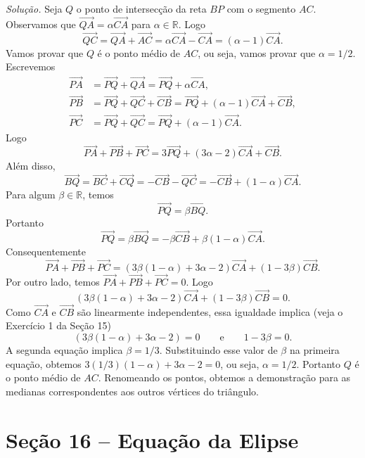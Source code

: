 \documentclass[a4paper,11pt]{article}
\newcommand{\R}{\mathbb{R}}
\begin{document}
\emph{Solução.}
Seja $Q$ o ponto de intersecção da reta $BP$ com o segmento $AC$.
Observamos que $\overrightarrow{QA} = \alpha \overrightarrow{CA}$ para $\alpha \in \R$.
Logo
\[
  \overrightarrow{QC} = \overrightarrow{QA} + \overrightarrow{AC} = \alpha \overrightarrow{CA} - \overrightarrow{CA} = (\alpha - 1) \overrightarrow{CA}.
\]
Vamos provar que $Q$ é o ponto médio de $AC$, ou seja, vamos provar que $\alpha = 1/2$.
Escrevemos
\begin{align*}
  \overrightarrow{PA} & = \overrightarrow{PQ} + \overrightarrow{QA} = \overrightarrow{PQ} + \alpha \overrightarrow{CA}, \\
  \overrightarrow{PB} & = \overrightarrow{PQ} + \overrightarrow{QC} + \overrightarrow{CB} = \overrightarrow{PQ} + (\alpha - 1) \overrightarrow{CA} + \overrightarrow{CB}, \\
  \overrightarrow{PC} & = \overrightarrow{PQ} + \overrightarrow{QC} = \overrightarrow{PQ} + (\alpha - 1) \overrightarrow{CA}.
\end{align*}
Logo
\[
  \overrightarrow{PA} + \overrightarrow{PB} + \overrightarrow{PC} = 3 \overrightarrow{PQ} + (3\alpha - 2) \overrightarrow{CA} + \overrightarrow{CB}.
\]
Além disso,
\[
  \overrightarrow{BQ} = \overrightarrow{BC} + \overrightarrow{CQ} = - \overrightarrow{CB} - \overrightarrow{QC} = - \overrightarrow{CB} + (1 - \alpha) \overrightarrow{CA}.
\]
Para algum $\beta \in \R$, temos
\[
  \overrightarrow{PQ} = \beta \overrightarrow{BQ}.
\]
Portanto
\[
  \overrightarrow{PQ} = \beta \overrightarrow{BQ} = - \beta \overrightarrow{CB} + \beta (1 - \alpha) \overrightarrow{CA}.
\]
Consequentemente
\[
  \overrightarrow{PA} + \overrightarrow{PB} + \overrightarrow{PC} = (3 \beta (1 - \alpha) + 3\alpha - 2) \overrightarrow{CA} + (1 - 3 \beta) \overrightarrow{CB}.
\]
Por outro lado, temos $\overrightarrow{PA} + \overrightarrow{PB} + \overrightarrow{PC} = 0$.
Logo
\[
  (3 \beta (1 - \alpha) + 3\alpha - 2) \overrightarrow{CA} + (1 - 3 \beta) \overrightarrow{CB} = 0.
\]
Como $\overrightarrow{CA}$ e $\overrightarrow{CB}$ são linearmente independentes, essa igualdade implica
(veja o Exercício 1 da Seção 15)
\[
  (3 \beta(1 - \alpha) + 3\alpha - 2) = 0 \qquad \text{e} \qquad 1 - 3 \beta = 0.
\]
A segunda equação implica $\beta = 1/3$.
Substituindo esse valor de $\beta$ na primeira equação, obtemos $3(1/3)(1 - \alpha) + 3\alpha - 2 = 0$, ou seja, $\alpha = 1/2$.
Portanto $Q$ é o ponto médio de $AC$.
Renomeando os pontos, obtemos a demonstração para as medianas correspondentes aos outros vértices do triângulo.

\section*{Seção 16 -- Equação da Elipse}
\end{document}
